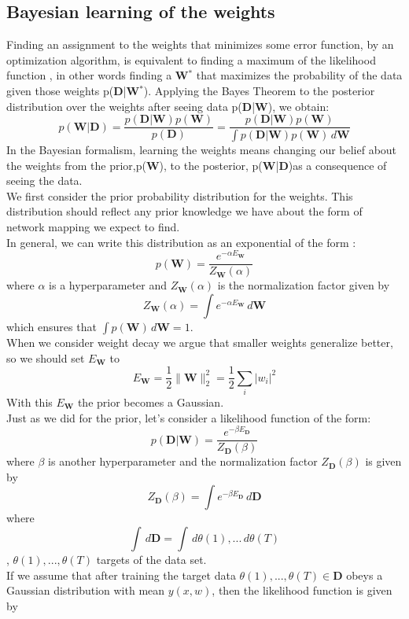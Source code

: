 \subsection{Bayesian learning of the weights}

Finding an assignment to the weights that minimizes some error function, by an optimization algorithm, is equivalent to ﬁnding a maximum of the likelihood  function , in other words ﬁnding a \textbf{W}${}^*$ that maximizes the probability of the data given those weights p(\textbf{D}|\textbf{W}${}^*$).
Applying the Bayes Theorem to the posterior distribution over the weights after seeing data p(\textbf{D}|\textbf{W}), we obtain:
$$p(\textbf{W}|\textbf{D})= \frac{p(\textbf{D}|\textbf{W}) p(\textbf{W})}{p(\textbf{D})}=\frac{p(\textbf{D}|\textbf{W}) p(\textbf{W})}{\int p(\textbf{D}|\textbf{W}) p(\textbf{W})\, d\textbf{W}}$$
In the Bayesian formalism, learning the weights means changing our belief about the weights from the prior,p(\textbf{W}), to the posterior, p(\textbf{W}|\textbf{D})as a consequence of seeing the data.\\
We first consider the prior probability distribution for the weights. This distribution should reflect any prior knowledge we have about the form of network mapping we expect to find.\\
 In general, we can write this distribution as an exponential of the form :
$$p(\textbf{W})=\frac{e^{-\alpha E_\textbf{W}}}{Z_\textbf{W} (\alpha)}$$
where $\alpha$ is a hyperparameter and $Z_\textbf{W} (\alpha)$ is the normalization factor given by 
$$Z_\textbf{W} (\alpha)= \int e^{-\alpha E_\textbf{W}}\, d\textbf{W} $$
which ensures that $\int p(\textbf{W})\, d\textbf{W}=1$.\\
When we consider weight decay we argue that smaller weights generalize better, so we should set $E_\textbf{W}$ to 
$$E_\textbf{W}=\frac{1}{2} \parallel \textbf{W} \parallel^2_2=\frac{1}{2} \sum_{i} |w_i|^2$$
With this $E_\textbf{W}$ the prior becomes a Gaussian.\\
Just as we did for the prior, let’s consider a likelihood function of the form:
$$p(\textbf{D}|\textbf{W})=\frac{e^{-\beta E_\textbf{D}}}{Z_\textbf{D}(\beta)}$$
where $\beta$ is another hyperparameter and the normalization factor $Z_\textbf{D}(\beta)$ is given by
$$Z_\textbf{D}(\beta)=\int e^{-\beta E_\textbf{D}}\, d\textbf{D}$$
where $$\int \, d\textbf{D}=\int \, d\theta(1),...\, d\theta(T)$$, $\theta(1),...,\theta(T)$ targets of the data set.\\
If we assume that after training the target data $\theta(1),...,\theta(T) \in \textbf{D}$ obeys a Gaussian distribution with mean $y(x, w)$, then the likelihood function is given by
